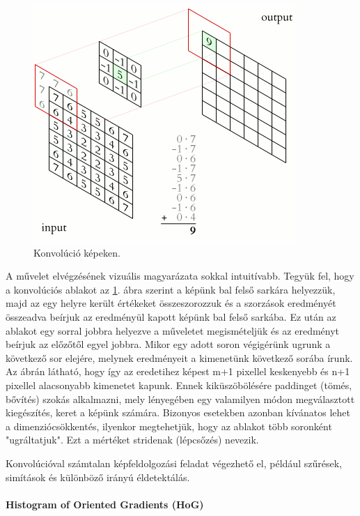 \begin{figure}[h]
    \centering
    \includegraphics[width=0.5\linewidth]{figures/2D_Convolution.png}
    \caption{Konvolúció képeken.}
    \label{fig:2d_convolution}
\end{figure}

A művelet elvégzésének vizuális magyarázata sokkal intuitívabb. Tegyük fel, hogy a konvolúciós ablakot az
\ref{fig:2d_convolution}. ábra
szerint a képünk bal felső sarkára helyezzük, majd az egy helyre került értékeket összeszorozzuk és a szorzások eredményét összeadva beírjuk az eredményül kapott képünk bal felső sarkába. Ez után az ablakot egy sorral jobbra helyezve a műveletet megismételjük és az eredményt beírjuk az előzőtől egyel jobbra. Mikor egy adott soron végigérünk ugrunk a következő sor elejére, melynek eredményeit a kimenetünk következő sorába írunk. Az ábrán látható, hogy így az eredetihez képest m+1 pixellel keskenyebb és n+1 pixellel alacsonyabb kimenetet kapunk. Ennek kiküszöbölésére paddinget (tömés, bővítés) szokás alkalmazni, mely lényegében egy valamilyen módon megválasztott kiegészítés, keret a képünk számára. Bizonyos esetekben azonban kívánatos lehet a dimenziócsökkentés, ilyenkor megtehetjük, hogy az ablakot több soronként "ugráltatjuk". Ezt a mértéket stridenak (lépcsőzés) nevezik.

Konvolúcióval számtalan képfeldolgozási feladat végezhető el, például szűrések, simítások és különböző irányú éldetektálás.

\paragraph{Histogram of Oriented Gradients (HoG)}\hfill

